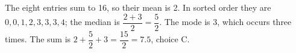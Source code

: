 The eight entries sum to 16, so their mean is 2. In sorted order they are $0,0,1,2,3,3,3,4$; the median is $\dfrac{2+3}{2}=\dfrac{5}{2}$. The mode is 3, which occurs three times. The sum is $2+\dfrac{5}{2}+3=\boxed{\dfrac{15}{2}=7.5}$, choice C.
